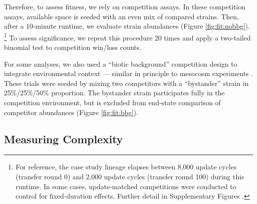 Therefore, to assess fitness, we rely on competition assays.
In these competition assays, available space is seeded with an even mix of compared strains.
Then, after a 10-minute runtime, we evaluate strain abundances (Figure \ref{fig:fit:nobbg}).
\unskip\footnote{%
For reference, the case study lineage elapses between 8,000 update cycles (transfer round 0) and 2,000 update cycles (transfer round 100) during this runtime.
In some cases, update-matched competitions were conducted to control for fixed-duration effects.
Further detail in Supplementary Figures .
}
To assess significance, we repeat this procedure 20 times and apply a two-tailed binomial test to competition win/loss counts.

For some analyses, we also used a ``biotic background'' competition design to integrate environmental context --- similar in principle to mesocosm experiments \citep{sala2000methods}.
These trials were seeded by mixing two competitors with a ``bystander'' strain in 25\%/25\%/50\% proportion.
The bystander strain participates fully in the competition environment, but is excluded from end-state comparison of competitor abundances (Figure \ref{fig:fit:bbg}).

\subsection{Measuring Complexity}
\label{sec:measuringcomplexity}

